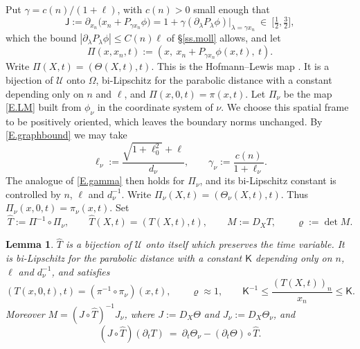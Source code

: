 \documentclass[10pt,a4paper]{amsart}
\numberwithin{equation}{section}
\newcommand{\abs}[1]{\left\vert#1\right\vert}
\newcommand{\br}[1]{\left(#1\right)}
\newcommand{\om}{\Omega}
\newcommand{\pd}{\partial}
\newcommand{\Uc}{\mathcal U}
\newtheorem{lemma}[equation]{Lemma}
\begin{document}
Put $\gamma=c(n)/(1+\ell)$, with $c(n)>0$ small enough that
\begin{equation}\label{E.gamma}
  \mathsf J:=\pd_{x_n}\Big(x_n+P_{\gamma x_n}\phi\Big)
   =1+\gamma\br{\pd_\lambda P_\lambda\phi}\big|_{\lambda=\gamma x_n}
  \ \in\ \big[\tfrac12,\tfrac32\big] ,
\end{equation}
which the bound $\abs{\pd_\lambda P_\lambda\phi}\le C(n)\ell$ of
\S\ref{ss.moll} allows, and let
\begin{equation}\label{E.LM}
  \Pi(x,x_n,t):=\br{x,\ x_n+P_{\gamma x_n}\phi(x,t),\ t} .
\end{equation}
Write $\Pi(X,t)=(\Theta(X,t),t)$. This is the Hofmann--Lewis map
\cite[(1.6)]{HLmem}. It is a bijection of $\Uc$ onto $\om$, bi-Lipschitz
for the parabolic distance with a constant depending only on $n$ and $\ell$, and
$\Pi(x,0,t)=\pi(x,t)$. Let $\Pi_\nu$ be the map \eqref{E.LM} built from
$\phi_\nu$ in the coordinate system of $\nu$. We choose this spatial frame
to be positively oriented, which leaves the boundary norms unchanged.
By \eqref{E.graphbound} we may take
\[
 \ell_\nu:=\frac{\sqrt{1+\ell_0^2}+\ell}{d_\nu},\qquad
 \gamma_\nu:=\frac{c(n)}{1+\ell_\nu}.
\]
The analogue of \eqref{E.gamma} then holds for $\Pi_\nu$, and its
bi-Lipschitz constant is controlled by $n$, $\ell$ and $d_\nu^{-1}$.
Write $\Pi_\nu(X,t)=(\Theta_\nu(X,t),t)$. Thus
$\Pi_\nu(x,0,t)=\pi_\nu(x,t)$. Set
\begin{equation}\label{E.T}
  \widehat T:=\Pi^{-1}\circ\Pi_\nu,\qquad
  \widehat T(X,t)=\br{T(X,t),t},\qquad
  M:=D_XT,\qquad \varrho:=\det M .
\end{equation}

\begin{lemma}\label{L.T}
$\widehat T$ is a bijection of $\Uc$ onto itself which preserves the time
variable. It is
bi-Lipschitz for the parabolic distance with a constant $\mathsf K$ depending
only on $n$, $\ell$ and $d_\nu^{-1}$, and satisfies
\begin{equation}\label{E.Tbdry}
  \br{T(x,0,t),t}=\br{\pi^{-1}\circ\pi_\nu}(x,t),\qquad
  \varrho\approx1,\qquad
  \mathsf K^{-1}\le\frac{(T(X,t))_n}{x_n}\le\mathsf K .
\end{equation}
Moreover $M=\br{J\circ\widehat T}^{-1}J_\nu$, where
$J:=D_X\Theta$ and $J_\nu:=D_X\Theta_\nu$, and
\begin{equation}\label{E.dtT}
  \br{J\circ\widehat T}\br{\pd_tT}
  \ =\ \pd_t\Theta_\nu-\br{\pd_t\Theta}\circ\widehat T .
\end{equation}
\end{lemma}
\end{document}
